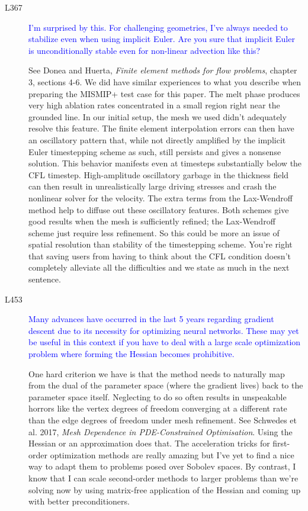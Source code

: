 \documentclass{article}
\theoremstyle{definition}
\theoremstyle{plain}
\begin{document}
\begin{description}
\item[L367] \textcolor{blue}{I'm surprised by this. For challenging geometries, I've always needed to
stabilize even when using implicit Euler. Are you sure that implicit Euler
is unconditionally stable even for non-linear advection like this?}

See Donea and Huerta, \emph{Finite element methods for flow problems}, chapter 3, sections 4-6.
We did have similar experiences to what you describe when preparing the MISMIP+ test case for this paper.
The melt phase produces very high ablation rates concentrated in a small region right near the grounded line.
In our initial setup, the mesh we used didn't adequately resolve this feature.
The finite element interpolation errors can then have an oscillatory pattern that, while not directly amplified by the implicit Euler timestepping scheme as such, still persists and gives a nonsense solution.
This behavior manifests even at timesteps substantially below the CFL timestep.
High-amplitude oscillatory garbage in the thickness field can then result in unrealistically large driving stresses and crash the nonlinear solver for the velocity.
The extra terms from the Lax-Wendroff method help to diffuse out these oscillatory features.
Both schemes give good results when the mesh is sufficiently refined; the Lax-Wendroff scheme just require less refinement.
So this could be more an issue of spatial resolution than stability of the timestepping scheme.
You're right that saving users from having to think about the CFL condition doesn't completely alleviate all the difficulties and we state as much in the next sentence.

\item[L453] \textcolor{blue}{Many advances have occurred in the last 5 years regarding gradient descent due to its necessity for optimizing neural networks. These may yet
be useful in this context if you have to deal with a large scale optimization
problem where forming the Hessian becomes prohibitive.}

One hard criterion we have is that the method needs to naturally map from the dual of the parameter space (where the gradient lives) back to the parameter space itself.
Neglecting to do so often results in unspeakable horrors like the vertex degrees of freedom converging at a different rate than the edge degrees of freedom under mesh refinement.
See Schwedes et al. 2017, \emph{Mesh Dependence in PDE-Constrained Optimisation}.
Using the Hessian or an approximation does that.
The acceleration tricks for first-order optimization methods are really amazing but I've yet to find a nice way to adapt them to problems posed over Sobolev spaces.
By contrast, I know that I can scale second-order methods to larger problems than we're solving now by using matrix-free application of the Hessian and coming up with better preconditioners.


\end{description}
\end{document}

